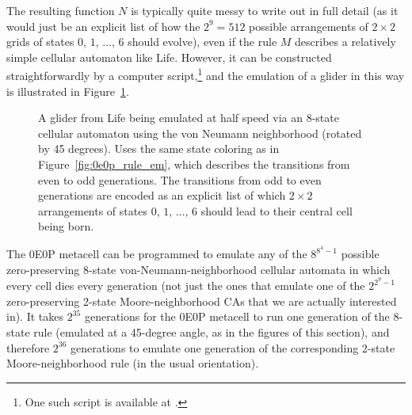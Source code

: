 The resulting function $N$ is typically quite messy to write out in full detail (as it would just be an explicit list of how the $2^9 = 512$ possible arrangements of $2 \times 2$ grids of states $0$, $1$, $\ldots$, $6$ should evolve), even if the rule $M$ describes a relatively simple cellular automaton like Life. However, it can be constructed straightforwardly by a computer script,\footnote{One such script is available at .} and the emulation of a glider in this way is illustrated in Figure~\ref{fig:0e0p_rule_em_glider}.

\begin{figure}[!htb]
	\centering
	\caption{A glider from Life being emulated at half speed via an $8$-state cellular automaton using the von Neumann neighborhood (rotated by 45 degrees). Uses the same state coloring as in Figure~\ref{fig:0e0p_rule_em}, which describes the transitions from even to odd generations. The transitions from odd to even generations are encoded as an explicit list of which $2 \times 2$ arrangements of states $0$, $1$, $\ldots$, $6$ should lead to their central cell being born.}\label{fig:0e0p_rule_em_glider}
\end{figure}

The 0E0P metacell can be programmed to emulate any of the $8^{8^4-1}$ possible zero-preserving 8-state von-Neumann-neighborhood cellular automata in which every cell dies every generation (not just the ones that emulate one of the $2^{2^9-1}$ zero-preserving 2-state Moore-neighborhood CAs that we are actually interested in). It takes $2^{35}$ generations for the 0E0P metacell to run one generation of the 8-state rule (emulated at a 45-degree angle, as in the figures of this section), and therefore $2^{36}$ generations to emulate one generation of the corresponding 2-state Moore-neighborhood rule (in the usual orientation).



